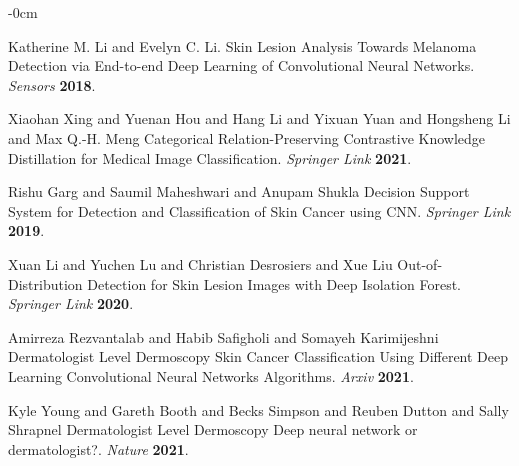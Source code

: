 \documentclass[sensors,article,submit,pdftex,moreauthors]{Definitions/mdpi}
\begin{document}
\begin{adjustwidth}{-\extralength}{0cm}



%

\begin{thebibliography}{999}

Katherine M. Li and Evelyn C. Li. Skin Lesion Analysis Towards Melanoma Detection via End-to-end Deep Learning of Convolutional Neural Networks. 
{\em Sensors} 
{\bf 2018}.

Xiaohan Xing and Yuenan Hou and  Hang Li and Yixuan Yuan and Hongsheng Li and Max Q.-H. Meng Categorical Relation-Preserving Contrastive Knowledge Distillation for Medical Image Classification. 
{\em Springer Link} 
{\bf 2021}.

Rishu Garg and Saumil Maheshwari and Anupam Shukla Decision Support System for Detection and Classification of Skin Cancer using CNN. {\em Springer Link} {\bf 2019}.

Xuan Li and Yuchen Lu and Christian Desrosiers and Xue Liu Out-of-Distribution Detection for Skin Lesion Images with Deep Isolation Forest. 
{\em Springer Link} 
{\bf 2020}.

Amirreza Rezvantalab and Habib Safigholi and Somayeh Karimijeshni Dermatologist Level Dermoscopy Skin Cancer Classification Using Different Deep Learning Convolutional Neural Networks Algorithms. 
{\em Arxiv} 
{\bf 2021}.

Kyle Young and Gareth Booth and Becks Simpson and Reuben Dutton and Sally Shrapnel Dermatologist Level Dermoscopy Deep neural network or dermatologist?. {\em Nature} 
{\bf 2021}.


\end{thebibliography}
\end{adjustwidth}
\end{document}
